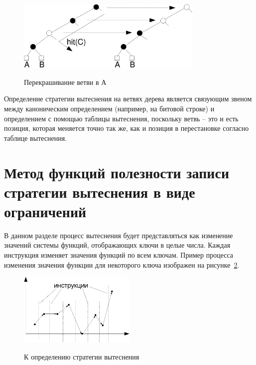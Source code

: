 \begin{figure}[h] \center
  \includegraphics[width=0.8\textwidth]{1.review/recolor}\\
  \caption{Перекрашивание ветви в А}\label{recolor}
\end{figure}


Определение стратегии вытеснения \PseudoLRU на ветвях дерева
является связующим звеном между каноническим определением (например,
на битовой строке) и определением с помощью таблицы вытеснения,
поскольку ветвь -- это и есть позиция, которая меняется точно так
же, как и позиция в перестановке согласно таблице вытеснения.



\section{Метод функций полезности записи стратегии вытеснения в виде ограничений}\label{sec:usefulness_functions}


В данном разделе процесс вытеснения будет представляться как изменение значений
системы функций, отображающих ключи в целые числа. Каждая инструкция изменяет значения функций по
всем ключам. Пример процесса изменения значения функции для некоторого ключа изображен на рисунке~\ref{fig:graphic}.

\begin{figure}[h] \center
  \includegraphics[width=0.5\textwidth]{2.theor/graphic}\\
  \caption{К определению стратегии вытеснения}\label{fig:graphic}
\end{figure}

